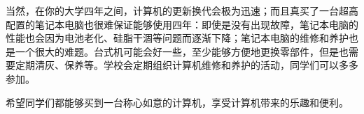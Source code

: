 \documentclass[../main.tex]{subfiles}
\begin{document}






当然，在你的大学四年之间，计算机的更新换代会极为迅速；而且真买了一台超高配置的笔记本电脑也很难保证能够使用四年：即使是没有出现故障，笔记本电脑的性能也会因为电池老化、硅脂干涸等问题而逐渐下降；笔记本电脑的维修和养护也是一个很大的难题。台式机可能会好一些，至少能够方便地更换零部件，但是也需要定期清灰、保养等。学校会定期组织计算机维修和养护的活动，同学们可以多多参加。

希望同学们都能够买到一台称心如意的计算机，享受计算机带来的乐趣和便利。
\end{document}
